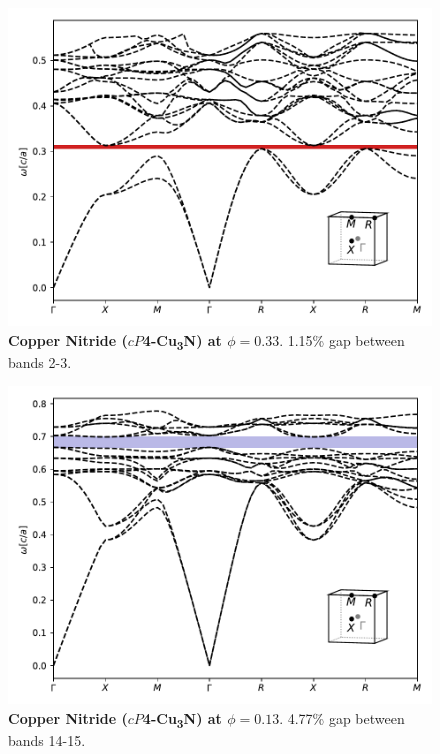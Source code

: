 \documentclass[fleqn,amsmath,amssymb,superscriptaddress, reprint,prl]{revtex4-1}
\begin{document}
\begin{figure}
\includegraphics[width=0.9\linewidth]{workspace/ae685deaffda03fb680bfeb2aff66835/images/r=27.pdf}
	\caption{\textbf{Copper Nitride ($cP$4-Cu\textsubscript{3}N) at $\phi=0.33$}. 1.15\% gap between bands 2-3.}
\end{figure}

\begin{figure}
\includegraphics[width=0.9\linewidth]{workspace/ae685deaffda03fb680bfeb2aff66835/images/r=20.pdf}
	\caption{\textbf{Copper Nitride ($cP$4-Cu\textsubscript{3}N) at $\phi=0.13$}. 4.77\% gap between bands 14-15.}
\end{figure}
\end{document}
